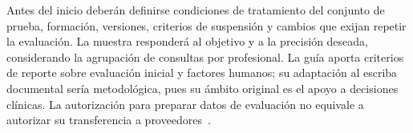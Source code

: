 Antes del inicio deberán definirse condiciones de tratamiento del conjunto de prueba, formación, versiones, criterios de suspensión y cambios que exijan repetir la evaluación. La muestra responderá al objetivo y a la precisión deseada, considerando la agrupación de consultas por profesional. La guía  aporta criterios de reporte sobre evaluación inicial y factores humanos; su adaptación al escriba documental sería metodológica, pues su ámbito original es el apoyo a decisiones clínicas. La autorización para preparar datos de evaluación no equivale a autorizar su transferencia a proveedores~\cite{rgpd2016}.
